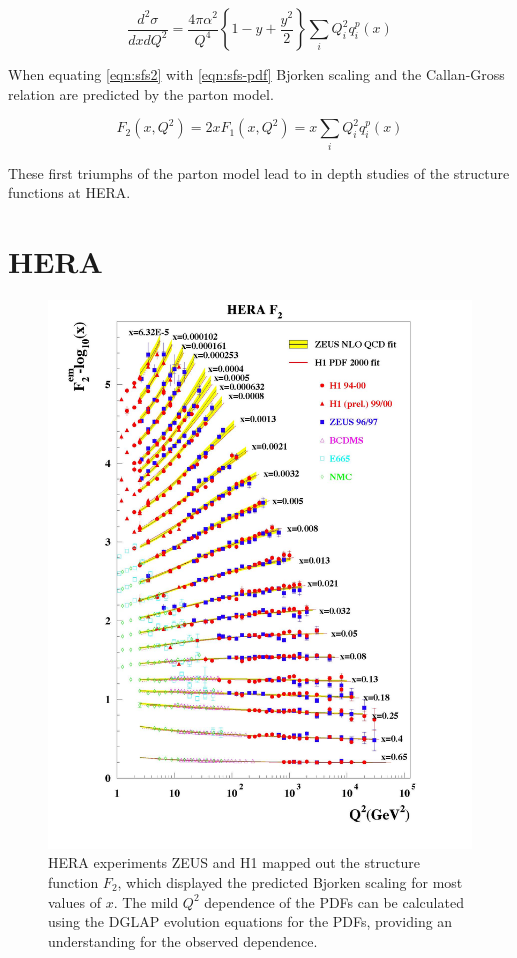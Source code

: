 \begin{equation}
	\label{eqn:sfs-pdf}
	\frac{d^2\sigma}{dx dQ^2} = \frac{4 \pi \alpha^2}{Q^4} \left\lbrace 1 - y + \frac{y^2}{2} \right\rbrace \sum_{i} Q_i^2 q_i^p (x)
\end{equation}

When equating \ref{eqn:sfs2} with \ref{eqn:sfs-pdf} Bjorken scaling and the Callan-Gross relation are predicted by the parton model.

\begin{equation}
	\label{eqn:bjorken-scaling}
	F_{2} (x, Q^2) = 2xF_1 (x, Q^2) = x \sum_{i} Q_i^2 q_i^p(x)
\end{equation}

These first triumphs of the parton model lead to in depth studies of the structure functions at HERA.

\section{HERA}

\begin{figure}
	\centering
	\includegraphics[width = \textwidth]{image/plots/introduction/f2.jpg}	
	\caption[$F_{2} (Q^2)$ results from HERA]{HERA experiments ZEUS and H1 mapped out the structure function $F_2$, which displayed the predicted Bjorken scaling for most values of $x$.   The mild $Q^2$ dependence of the PDFs can be calculated using the DGLAP evolution equations for the PDFs, providing an understanding for the observed dependence.}
	\label{fig:f2}
\end{figure}

